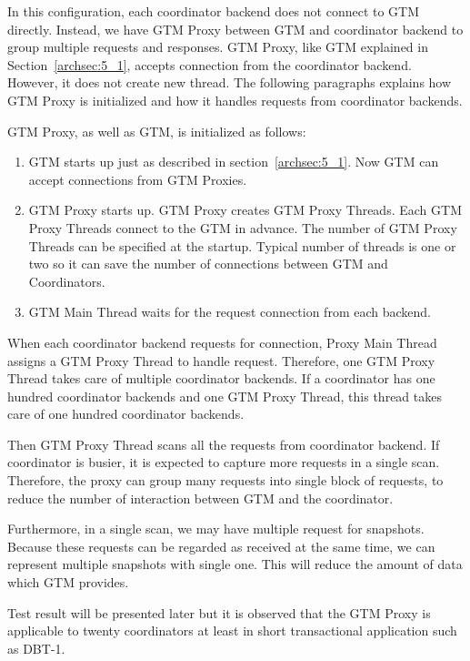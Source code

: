   In this configuration, each coordinator backend does not connect to GTM directly.
  Instead, we have GTM Proxy between GTM and coordinator backend to group multiple
  requests and responses.
  GTM Proxy, like GTM explained in Section~\ref{archsec:5_1}, accepts connection from
  the coordinator backend.
  However, it does not create new thread.
  The following paragraphs explains how GTM Proxy is initialized and how it handles
  requests from coordinator backends.
  
  GTM Proxy, as well as GTM, is initialized as follows:
  
  \begin{enumerate}
	  \item GTM starts up just as described in section~\ref{archsec:5_1}.
	  		Now GTM can accept connections from GTM Proxies.
	  \item GTM Proxy starts up.
  			GTM Proxy creates GTM Proxy Threads.
  			Each GTM Proxy Threads connect to the GTM in advance.
  			The number of GTM Proxy Threads can be specified at the startup.
  			Typical number of threads is one or two so it can save the number of
			connections between GTM and Coordinators.
	  \item GTM Main Thread waits for the request connection from each backend.
  \end{enumerate}
  
  When each coordinator backend requests for connection, Proxy Main Thread assigns
  a GTM Proxy Thread to handle request.
  Therefore, one GTM Proxy Thread takes care of multiple coordinator backends.
  If a coordinator has one hundred coordinator backends and one GTM Proxy Thread,
  this thread takes care of one hundred coordinator backends.
  
  Then GTM Proxy Thread scans all the requests from coordinator backend.
  If coordinator is busier, it is expected to capture more requests in
  a single scan.
  Therefore, the proxy can group many requests into single block of requests,
  to reduce the number of interaction between GTM and the coordinator.
  
  Furthermore, in a single scan, we may have multiple request for snapshots.
  Because these requests can be regarded as received at the same time, we can
  represent multiple snapshots with single one.
  This will reduce the amount of data which GTM provides.
  
  Test result will be presented later but it is observed that the GTM Proxy is applicable to
  twenty coordinators at least in short transactional application such as DBT-1.
  

